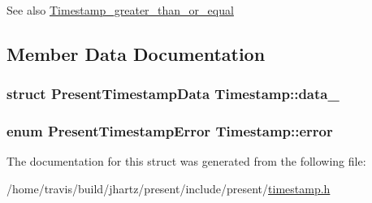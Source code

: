 \begin{DoxySeeAlso}{\-See also}
\hyperlink{timestamp_8h_ac8e73c119be15b81647851f16f4013b9}{\-Timestamp\-\_\-greater\-\_\-than\-\_\-or\-\_\-equal} 
\end{DoxySeeAlso}


\subsection{\-Member \-Data \-Documentation}
\hypertarget{structTimestamp_adf3177050edc50aa8b6e768922e4cf56}{
\subsubsection[{data\-\_\-}]{\setlength{\rightskip}{0pt plus 5cm}struct \-Present\-Timestamp\-Data {\bf \-Timestamp\-::data\-\_\-}}}\label{structTimestamp_adf3177050edc50aa8b6e768922e4cf56}
\hypertarget{structTimestamp_a2ac4b53468d2a270e2ba5f05af9d7472}{
\subsubsection[{error}]{\setlength{\rightskip}{0pt plus 5cm}enum {\bf \-Present\-Timestamp\-Error} {\bf \-Timestamp\-::error}}}\label{structTimestamp_a2ac4b53468d2a270e2ba5f05af9d7472}


\-The documentation for this struct was generated from the following file\-:\begin{DoxyCompactItemize}
\item 
/home/travis/build/jhartz/present/include/present/\hyperlink{timestamp_8h}{timestamp.\-h}\end{DoxyCompactItemize}
